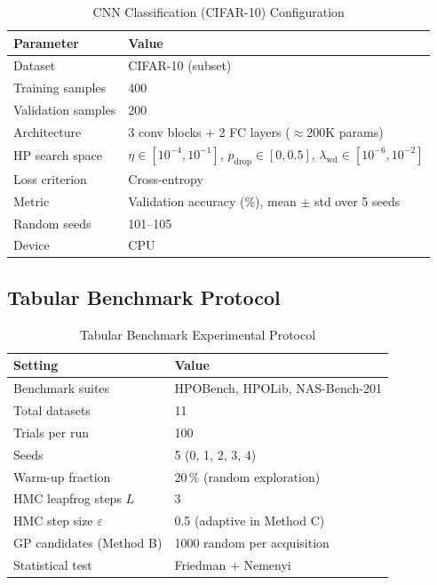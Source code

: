 \documentclass[11pt]{article}
\theoremstyle{definition}
\begin{document}
\begin{table}[H]
\centering
\caption{CNN Classification (CIFAR-10) Configuration}
\label{tab:cnn_setup}
\renewcommand{\arraystretch}{1.2}
\begin{tabular}{ll}
\toprule
Parameter & Value \\
\midrule
Dataset              & CIFAR-10 (subset) \\
Training samples     & 400 \\
Validation samples   & 200 \\
Architecture         & 3 conv blocks + 2 FC layers ($\approx$200K params) \\
HP search space      & $\eta\in[10^{-4},10^{-1}]$,
                       $p_{\mathrm{drop}}\in[0,0.5]$,
                       $\lambda_{\mathrm{wd}}\in[10^{-6},10^{-2}]$ \\
Loss criterion       & Cross-entropy \\
Metric               & Validation accuracy (\%), mean $\pm$ std over 5 seeds \\
Random seeds         & 101--105 \\
Device               & CPU \\
\bottomrule
\end{tabular}
\end{table}

\subsection{Tabular Benchmark Protocol}
\begin{table}[H]
\centering
\caption{Tabular Benchmark Experimental Protocol}
\label{tab:tabular_protocol}
\renewcommand{\arraystretch}{1.2}
\begin{tabular}{ll}
\toprule
Setting & Value \\
\midrule
Benchmark suites     & HPOBench, HPOLib, NAS-Bench-201 \\
Total datasets       & 11 \\
Trials per run       & 100 \\
Seeds                & 5 (0, 1, 2, 3, 4) \\
Warm-up fraction     & 20\,\% (random exploration) \\
HMC leapfrog steps $L$ & 3 \\
HMC step size $\varepsilon$ & 0.5 (adaptive in Method C) \\
GP candidates (Method B) & 1000 random per acquisition \\
Statistical test     & Friedman + Nemenyi~\cite{demsar2006} \\
\bottomrule
\end{tabular}
\end{table}
\end{document}
